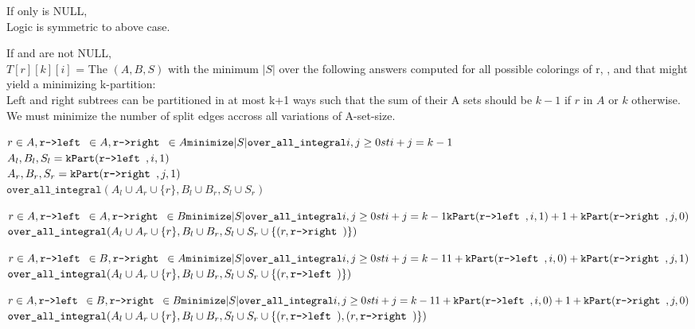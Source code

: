 \documentclass[11pt]{article}
\begin{document}
\begin{indentmore}
    If only \rright is NULL,\\
        Logic is symmetric to above case.

    If \rleft and \rright are not NULL,\\
        $T[r][k][i]$ = The $(A,B,S)$ with the minimum $|S|$ over the following answers computed for all possible colorings of r, \rright, and \rleft that might yield a minimizing k-partition:\\
                Left and right subtrees can be partitioned in at most k+1 ways such that the sum of their A sets should be $k-1$ if $r$ in $A$ or $k$ otherwise.\\
                We must minimize the number of split edges accross all variations of A-set-size.

          $r \in A, \texttt{r->left } \in A, \texttt{r->right } \in A\\
              \texttt{minimize} |S| \texttt{over\_all\_integral} i,j \geq 0 st i+j = k-1$\\
                $A_l, B_l, S_l = \mathtt{kPart}(\texttt{r->left },i,1)$\\
                $A_r, B_r, S_r = \mathtt{kPart}(\texttt{r->right },j,1)$\\
                $\texttt{over\_all\_integral} (A_l \cup A_r \cup \{r\},B_l \cup B_r,S_l \cup S_r)$

          $r \in A, \texttt{r->left } \in A, \texttt{r->right } \in B\\
              \texttt{minimize} |S| \texttt{over\_all\_integral} i,j \geq 0 st i+j = k-1\\
                    \mathtt{kPart}(\texttt{r->left },i,1) + 1 + \mathtt{kPart}(\texttt{r->right },j,0)$\\
                $\texttt{over\_all\_integral} (A_l \cup A_r \cup \{r\},B_l \cup B_r,S_l \cup S_r \cup \{(r, \texttt{r->right })\})$

          $r \in A, \texttt{r->left } \in B, \texttt{r->right } \in A\\
              \texttt{minimize} |S| \texttt{over\_all\_integral} i,j \geq 0 st i+j = k-1\\
                1 + \mathtt{kPart}(\texttt{r->left },i,0) +     \mathtt{kPart}(\texttt{r->right },j,1)$\\
                $\texttt{over\_all\_integral} (A_l \cup A_r \cup \{r\},B_l \cup B_r,S_l \cup S_r \cup \{(r, \texttt{r->left })\})$

          $r \in A, \texttt{r->left } \in B, \texttt{r->right } \in B\\
              \texttt{minimize} |S| \texttt{over\_all\_integral} i,j \geq 0 st i+j = k-1\\
                1 + \mathtt{kPart}(\texttt{r->left },i,0) + 1 + \mathtt{kPart}(\texttt{r->right },j,0)$\\
                $\texttt{over\_all\_integral} (A_l \cup A_r \cup \{r\},B_l \cup B_r,S_l \cup S_r \cup \{(r, \texttt{r->left }),(r, \texttt{r->right })\})$


\end{indentmore}
\end{document}
